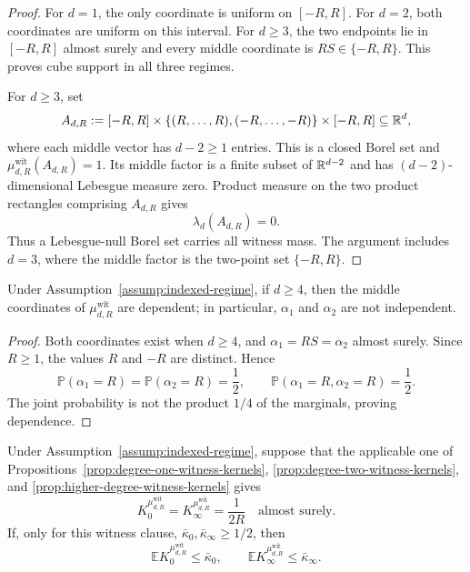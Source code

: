 \begin{proof}
For $d=1$, the only coordinate is uniform on $[-R,R]$.  For $d=2$, both
coordinates are uniform on this interval.  For $d\geq3$, the two endpoints
lie in $[-R,R]$ almost surely and every middle coordinate is
$RS\in\{-R,R\}$.  This proves cube support in all three regimes.

For $d\geq3$, set
\[
A_{d,R}:=[-R,R]\times
\{(R,\ldots,R),(-R,\ldots,-R)\}\times[-R,R]\subseteq\mathbb{R}^d,
\]
where each middle vector has $d-2\geq1$ entries.  This is a closed Borel set
and $\mu^{\mathrm{wit}}_{d,R}(A_{d,R})=1$.  Its middle factor is a finite
subset of $\mathbb{R}^{d-2}$ and has $(d-2)$-dimensional Lebesgue measure zero.
Product measure on the two product rectangles comprising $A_{d,R}$
\cite[Theorem~2.37]{Folland1999} gives
\[
\lambda_d(A_{d,R})=0.
\]
Thus a Lebesgue-null Borel set carries all witness mass.  The argument
includes $d=3$, where the middle factor is the two-point set $\{-R,R\}$.
\end{proof}

\begin{proposition}
\label{prop:witness-middle-dependence}
Under Assumption~\ref{assump:indexed-regime}, if $d\geq4$, then the middle
coordinates of $\mu^{\mathrm{wit}}_{d,R}$ are dependent; in particular,
$\alpha_1$ and $\alpha_2$ are not independent.
\end{proposition}

\begin{proof}
Both coordinates exist when $d\geq4$, and
$\alpha_1=RS=\alpha_2$ almost surely.  Since $R\geq1$, the values $R$ and
$-R$ are distinct.  Hence
\[
\mathbb P(\alpha_1=R)=\mathbb P(\alpha_2=R)=\frac12,
\qquad
\mathbb P(\alpha_1=R,\alpha_2=R)=\frac12.
\]
The joint probability is not the product $1/4$ of the marginals, proving
dependence.
\end{proof}

\begin{lemma}
\label{lem:witness-threshold}
Under Assumption~\ref{assump:indexed-regime}, suppose that the applicable
one of Propositions~\ref{prop:degree-one-witness-kernels},
\ref{prop:degree-two-witness-kernels}, and
\ref{prop:higher-degree-witness-kernels} gives
\[
K_0^{\mu^{\mathrm{wit}}_{d,R}}
=K_\infty^{\mu^{\mathrm{wit}}_{d,R}}
=\frac1{2R}\quad\text{almost surely}.
\]
If, only for this witness clause,
$\bar\kappa_0,\bar\kappa_\infty\geq1/2$, then
\[
\mathbb E K_0^{\mu^{\mathrm{wit}}_{d,R}}\leq\bar\kappa_0,
\qquad
\mathbb E K_\infty^{\mu^{\mathrm{wit}}_{d,R}}\leq\bar\kappa_\infty.
\]
\end{lemma}

